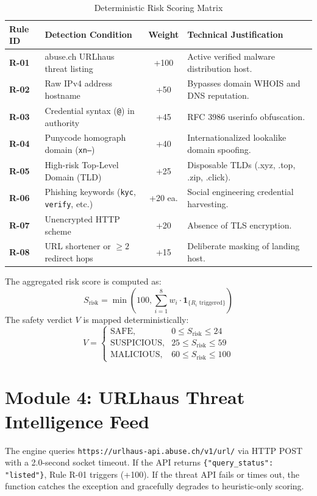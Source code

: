 \documentclass[12pt,a4paper]{report}
\begin{document}
\begin{table}[htbp]
\centering
\caption{Deterministic Risk Scoring Matrix}
\label{tab:heuristic_rules}
\begin{tabularx}{\textwidth}{l p{6.5cm} c p{4.5cm}}
\toprule
\textbf{Rule ID} & \textbf{Detection Condition} & \textbf{Weight} & \textbf{Technical Justification} \\
\midrule
\textbf{R-01} & abuse.ch URLhaus threat listing & +100 & Active verified malware distribution host. \\
\textbf{R-02} & Raw IPv4 address hostname & +50 & Bypasses domain WHOIS and DNS reputation. \\
\textbf{R-03} & Credential syntax (\texttt{@}) in authority & +45 & RFC 3986 userinfo obfuscation. \\
\textbf{R-04} & Punycode homograph domain (\texttt{xn--}) & +40 & Internationalized lookalike domain spoofing. \\
\textbf{R-05} & High-risk Top-Level Domain (TLD) & +25 & Disposable TLDs (.xyz, .top, .zip, .click). \\
\textbf{R-06} & Phishing keywords (\texttt{kyc}, \texttt{verify}, etc.) & +20 ea. & Social engineering credential harvesting. \\
\textbf{R-07} & Unencrypted HTTP scheme & +20 & Absence of TLS encryption. \\
\textbf{R-08} & URL shortener or $\ge 2$ redirect hops & +15 & Deliberate masking of landing host. \\
\bottomrule
\end{tabularx}
\end{table}

The aggregated risk score is computed as:
\begin{equation}
    S_{\text{risk}} = \min\left(100, \sum_{i=1}^{8} w_i \cdot \mathbf{1}_{\{R_i \text{ triggered}\}}\right)
\end{equation}
The safety verdict $V$ is mapped deterministically:
\begin{equation}
    V = \begin{cases}
        \text{SAFE}, & 0 \le S_{\text{risk}} \le 24 \\
        \text{SUSPICIOUS}, & 25 \le S_{\text{risk}} \le 59 \\
        \text{MALICIOUS}, & 60 \le S_{\text{risk}} \le 100
    \end{cases}
\end{equation}

\section{Module 4: URLhaus Threat Intelligence Feed}
The engine queries \texttt{https://urlhaus-api.abuse.ch/v1/url/} via HTTP POST with a 2.0-second socket timeout. If the API returns \texttt{\{"query\_status": "listed"\}}, Rule R-01 triggers (+100). If the threat API fails or times out, the function catches the exception and gracefully degrades to heuristic-only scoring.
\end{document}
